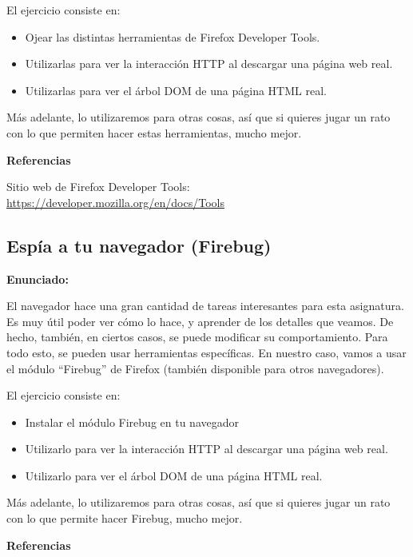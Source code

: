 El ejercicio consiste en:

\begin{itemize}
\item Ojear las distintas herramientas de Firefox Developer Tools.
\item Utilizarlas para ver la interacción HTTP al descargar una página web real.
\item Utilizarlas para ver el árbol DOM de una página HTML real.
\end{itemize}

Más adelante, lo utilizaremos para otras cosas, así que si quieres jugar un rato con lo que permiten hacer estas herramientas, mucho mejor.

\textbf{Referencias}

Sitio web de Firefox Developer Tools: \\
\url{https://developer.mozilla.org/en/docs/Tools}

\subsection{Espía a tu navegador (Firebug)}
\label{subsec:eje-firebug}

\textbf{Enunciado:}

El navegador hace una gran cantidad de tareas interesantes para esta asignatura. Es muy útil poder ver cómo lo hace, y aprender de los detalles que veamos. De hecho, también, en ciertos casos, se puede modificar su comportamiento. Para todo esto, se pueden usar herramientas específicas. En nuestro caso, vamos a usar el módulo ``Firebug'' de Firefox (también disponible para otros navegadores).

El ejercicio consiste en:

\begin{itemize}
\item Instalar el módulo Firebug en tu navegador
\item Utilizarlo para ver la interacción HTTP al descargar una página web real.
\item Utilizarlo para ver el árbol DOM de una página HTML real.
\end{itemize}

Más adelante, lo utilizaremos para otras cosas, así que si quieres jugar un rato con lo que permite hacer Firebug, mucho mejor.

\textbf{Referencias}

